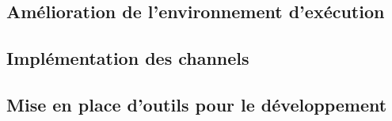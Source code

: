 \subsection{Amélioration de l'environnement d'exécution}
\subsection{Implémentation des channels}
\subsection{Mise en place d'outils pour le développement}